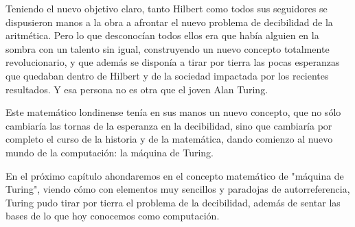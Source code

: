 Teniendo el nuevo objetivo claro, tanto Hilbert como todos sus seguidores se dispusieron manos a la obra a afrontar el nuevo problema de decibilidad de la aritmética. Pero lo que desconocían todos ellos era que había alguien en la sombra con un talento sin igual, 
construyendo un nuevo concepto totalmente revolucionario, y que además se disponía a tirar por tierra las pocas esperanzas que quedaban dentro de Hilbert y de la sociedad impactada por los recientes resultados. Y esa persona no es otra que el joven Alan Turing.

Este matemático londinense tenía en sus manos un nuevo concepto, que no sólo cambiaría las tornas de la esperanza en la decibilidad, sino que cambiaría por completo el curso de la historia y de la matemática, dando comienzo al nuevo mundo de la computación: la máquina 
de Turing. 

En el próximo capítulo ahondaremos en el concepto matemático de "máquina de Turing", viendo cómo con elementos muy sencillos y paradojas de autorreferencia, Turing pudo tirar por tierra el problema de la decibilidad, además de sentar las bases de lo que hoy conocemos 
como computación.

\endinput

